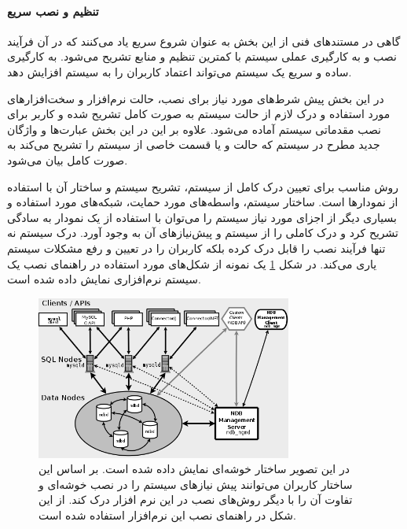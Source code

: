 \paragraph{تنظیم و نصب سریع}
   گاهی در مستند‌های فنی از این بخش به عنوان شروع سریع یاد می‌کنند که در آن
   فرآیند نصب و به کارگیری عملی سیستم با کمترین تنظیم و منابع تشریح می‌شود. به
   کارگیری ساده و سریع یک سیستم می‌تواند اعتماد کاربران را به سیستم افزایش دهد.

   در این بخش پیش شرط‌های مورد نیاز برای نصب، حالت نرم‌افزار و سخت‌افزارهای مورد
   استفاده و درک لازم از حالت سیستم به صورت کامل تشریح شده و کاربر برای نصب
   مقدماتی سیستم آماده می‌شود. علاوه بر این در این بخش عبارت‌ها و واژگان جدید
   مطرح در سیستم که حالت و یا قسمت خاصی از سیستم را تشریح می‌کند به صورت کامل
   بیان می‌شود.

   روش مناسب برای تعیین درک کامل از سیستم، تشریح سیستم و ساختار آن با
   استفاده از نمودارها است.
   ساختار سیستم، واسطه‌های مورد حمایت، شبکه‌های مورد استفاده و بسیاری دیگر از
   اجزای مورد نیاز سیستم را می‌توان با استفاده از یک نمودار به سادگی تشریح
   کرد و درک کاملی را از سیستم و پیش‌نیازهای آن به وجود آورد. درک سیستم نه تنها
   فرآیند نصب را قابل درک کرده بلکه کاربران را در تعیین و رفع مشکلات سیستم یاری
   می‌کند. در شکل 
   \ref{تصویر-ساختار-خوشه-پایگاه-داده}
    یک نمونه از شکل‌های مورد
   استفاده در راهنمای نصب یک سیستم نرم‌افزاری نمایش داده شده است.
  \begin{figure}
    \centering
    \includegraphics[width=0.75\textwidth]{image/mysql-cluster-install.png}
    \caption[ساختار خوشه‌ای پایگاه داده]
    {
      در این تصویر ساختار خوشه‌ای  نمایش داده شده است. بر اساس این
      ساختار کاربران می‌توانند پیش نیازهای سیستم را در نصب خوشه‌ای و تفاوت آن را
      با دیگر روش‌های نصب در این نرم افزار درک کند.
      از این شکل در راهنمای نصب این نرم‌افزار استفاده شده است.
    }
    \label{تصویر-ساختار-خوشه-پایگاه-داده}
  \end{figure}
  

